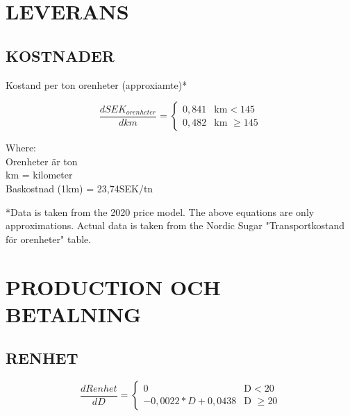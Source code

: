 \documentclass[fleqn]{article}
\begin{document}



\pagebreak
\section{LEVERANS}

  \subsection{KOSTNADER}
  
  Kostand per ton orenheter (approxiamte)*
  
    \begin{equation}
    \frac{dSEK_{orenheter}}{dkm} =
    \begin{cases}
      0,841 & \text{km} < 145\\
      0,482 & \text{km $\geq 145$}
    \end{cases}
  \end{equation}

  Where:\\
  \hangindent=1.5cm
  Orenheter är ton\\
  km = kilometer\\
  Baskostnad (1km) = 23,74SEK/tn
  
  \medskip
  *Data is taken from the 2020 price model. The above equations are only approximations. 
  Actual data is taken from the Nordic Sugar "Transportkostand för orenheter" table. 


\pagebreak
\section{PRODUCTION OCH BETALNING}

  \subsection{RENHET}

  \begin{equation}
    \frac{dRenhet}{dD} =
    \begin{cases}
      0 & \text{D} < 20\\
      -0,0022*D + 0,0438 & \text{D $\geq 20$}
    \end{cases}
  \end{equation}
\end{document}
